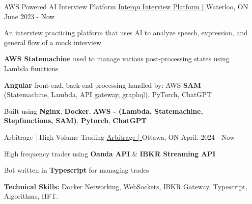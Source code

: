 \begin{cventries}
	\cventry
	{AWS Powered AI Interview Platform}
	{\underline{\href{https://github.com/Interqu}{Interqu Interview Platform | \ExternalLink}}} %
	{Waterloo, ON} %
	{June 2023 - Now} %
	{
		\begin{cvitems} %
			\item {An interview practicing platform that uses AI to analyze speech, expression, and general flow of a mock interview}
			\item {\textbf{AWS Statemachine} used to manage various post-processing states using Lambda functions}
			\item {\textbf{Angular} front-end, back-end processing handled by: AWS \textbf{SAM} - (Statemachine, Lambda, API gateway, graphql), PyTorch, ChatGPT}
			\item {Built using \textbf{Nginx}, \textbf{Docker}, \textbf{AWS - (Lambda, Statemachine, Stepfunctions, SAM)}, \textbf{Pytorch}, \textbf{ChatGPT}}
		\end{cvitems}
	}

	\cventry
	{Arbitrage | High Volume Trading}
	{\underline{\href{https://github.com/LefanHu/OARB}{Arbitrage | \ExternalLink}}} %
	{Ottawa, ON} %
	{April. 2024 - Now} %
	{
		\begin{cvitems} %
			\item {High frequency trader using \textbf{Oanda API} \& \textbf{IBKR Streaming API}}
			\item {Bot written in \textbf{Typescript} for managing trades}
			\item {\textbf{Technical Skills:} Docker Networking, WebSockets, IBKR Gateway, Typescript, Algorithms, HFT.}
		\end{cvitems}
	}







\end{cventries}
